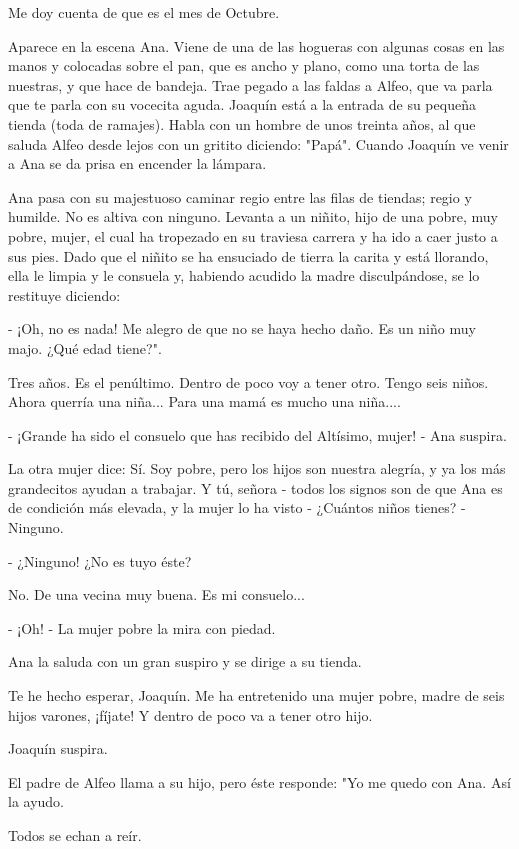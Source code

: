 \documentclass[12pt, twoside, openright]{book} %
\begin{document}
Me doy cuenta de que es el mes de Octubre. 

Aparece en la escena Ana. Viene de una de las hogueras con algunas cosas en las manos y colocadas sobre el pan, que es ancho y plano, como una torta de las nuestras, y que hace de bandeja. Trae pegado a las faldas a Alfeo, que va parla que te parla con su vocecita aguda. Joaquín está a la entrada de su pequeña tienda (toda de ramajes). Habla con un hombre de unos treinta años, al que saluda Alfeo desde lejos con un gritito diciendo: "Papá". Cuando Joaquín ve venir a Ana se da prisa en encender la lámpara. 

Ana pasa con su majestuoso caminar regio entre las filas de tiendas; regio y humilde. No es altiva con ninguno. Levanta a un niñito, hijo de una pobre, muy pobre, mujer, el cual ha tropezado en su traviesa carrera y ha ido a caer justo a sus pies. Dado que el niñito se ha ensuciado de tierra la carita y está llorando, ella le limpia y le consuela y, habiendo acudido la madre disculpándose, se lo restituye diciendo: 

- ¡Oh, no es nada! Me alegro de que no se haya hecho daño. Es un niño muy majo. ¿Qué edad tiene?". 

Tres años. Es el penúltimo. Dentro de poco voy a tener otro. Tengo seis niños. Ahora querría una niña... Para una mamá es mucho una niña.... 

- ¡Grande ha sido el consuelo que has recibido del Altísimo, mujer! - Ana suspira. 

La otra mujer dice: Sí. Soy pobre, pero los hijos son nuestra alegría, y ya los más grandecitos ayudan a trabajar. Y tú, señora - todos los signos son de que Ana es de condición más elevada, y la mujer lo ha visto - ¿Cuántos niños tienes? - Ninguno. 

- ¿Ninguno! ¿No es tuyo éste? 

No. De una vecina muy buena. Es mi consuelo... 

 - ¡Oh! - La mujer pobre la mira con piedad. 

Ana la saluda con un gran suspiro y se dirige a su tienda. 

Te he hecho esperar, Joaquín. Me ha entretenido una mujer pobre, madre de seis hijos varones, ¡fíjate! Y dentro de poco va a tener otro hijo. 

Joaquín suspira. 

El padre de Alfeo llama a su hijo, pero éste responde: "Yo me quedo con Ana. Así la ayudo. 

Todos se echan a reír. 
\end{document}
